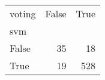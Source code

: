 \begin{tabular}{lrr}
\toprule
voting &  False &  True  \\
svm   &        &        \\
\midrule
False &     35 &     18 \\
True  &     19 &    528 \\
\bottomrule
\end{tabular}
